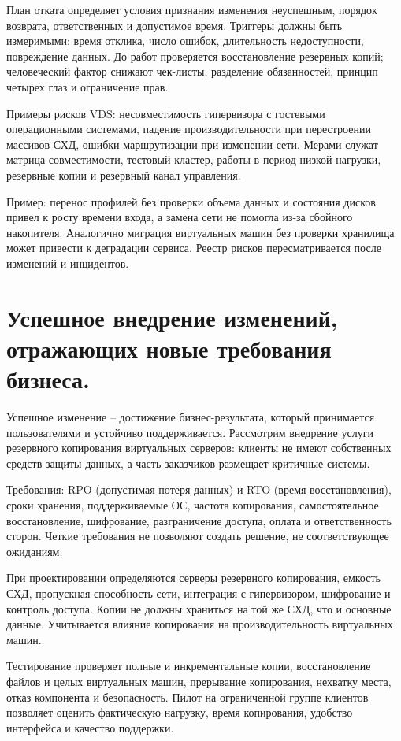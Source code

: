 \documentclass[14pt,a4paper]{extarticle}
\begin{document}
План отката определяет условия признания изменения неуспешным, порядок возврата,
ответственных и допустимое время. Триггеры должны быть измеримыми: время отклика,
число ошибок, длительность недоступности, повреждение данных. До работ проверяется
восстановление резервных копий; человеческий фактор снижают чек-листы, разделение
обязанностей, принцип четырех глаз и ограничение прав.

Примеры рисков VDS: несовместимость гипервизора с гостевыми операционными
системами, падение производительности при перестроении массивов СХД, ошибки
маршрутизации при изменении сети. Мерами служат матрица совместимости, тестовый
кластер, работы в период низкой нагрузки, резервные копии и резервный канал
управления.

Пример: перенос профилей без проверки объема данных и состояния дисков привел
к росту времени входа, а замена сети не помогла из-за сбойного накопителя.
Аналогично миграция виртуальных машин без проверки хранилища может привести к
деградации сервиса. Реестр рисков пересматривается после изменений и инцидентов.

\section{Успешное внедрение изменений, отражающих новые требования бизнеса.}

Успешное изменение -- достижение бизнес-результата, который принимается
пользователями и устойчиво поддерживается. Рассмотрим внедрение услуги
резервного копирования виртуальных серверов: клиенты не имеют собственных
средств защиты данных, а часть заказчиков размещает критичные системы.

Требования: RPO (допустимая потеря данных) и RTO (время восстановления), сроки
хранения, поддерживаемые ОС, частота копирования, самостоятельное восстановление,
шифрование, разграничение доступа, оплата и ответственность сторон. Четкие
требования не позволяют создать решение, не соответствующее ожиданиям.

При проектировании определяются серверы резервного копирования, емкость СХД,
пропускная способность сети, интеграция с гипервизором, шифрование и контроль
доступа. Копии не должны храниться на той же СХД, что и основные данные.
Учитывается влияние копирования на производительность виртуальных машин.

Тестирование проверяет полные и инкрементальные копии, восстановление файлов и
целых виртуальных машин, прерывание копирования, нехватку места, отказ компонента
и безопасность. Пилот на ограниченной группе клиентов позволяет оценить
фактическую нагрузку, время копирования, удобство интерфейса и качество
поддержки.
\end{document}
